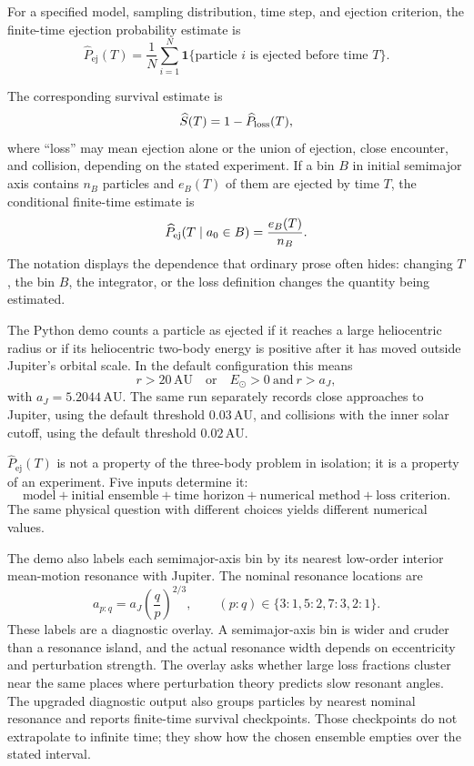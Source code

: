 \begin{definition}
For a specified model, sampling distribution, time step, and ejection criterion,
the finite-time ejection probability estimate is
\[
  \widehat P_{\mathrm{ej}}(T)
  =
  \frac{1}{N}
  \sum_{i=1}^{N}\mathbf 1\{\text{particle \(i\) is ejected before time \(T\)}\}.
\]
\end{definition}

The corresponding survival estimate is
\[
  \widehat S(T)=1-\widehat P_{\rm loss}(T),
\]
where ``loss'' may mean ejection alone or the union of ejection, close
encounter, and collision, depending on the stated experiment.  If a bin
\(B\) in initial semimajor axis contains \(n_B\) particles and \(e_B(T)\) of
them are ejected by time \(T\), the conditional finite-time estimate is
\[
  \widehat P_{\rm ej}(T\mid a_0\in B)=\frac{e_B(T)}{n_B}.
\]
The notation displays the dependence that ordinary prose often hides:
changing \(T\), the bin \(B\), the integrator, or the loss definition changes
the quantity being estimated.

\begin{remark}
The Python demo counts a particle as ejected if it reaches a large heliocentric
radius or if its heliocentric two-body energy is positive after it has moved
outside Jupiter's orbital scale. In the default configuration this means
\[
  r>20\,\mathrm{AU}
  \quad\text{or}\quad
  E_{\odot}>0\ \text{and}\ r>a_J,
\]
with \(a_J=5.2044\,\mathrm{AU}\). The same run separately records close
approaches to Jupiter, using the default threshold \(0.03\,\mathrm{AU}\), and
collisions with the inner solar cutoff, using the default threshold
\(0.02\,\mathrm{AU}\).
\end{remark}

\(\widehat P_{\mathrm{ej}}(T)\) is not a property of the three-body problem in
isolation; it is a property of an experiment. Five inputs determine it:
\[
  \text{model}+\text{initial ensemble}+\text{time horizon}
  +\text{numerical method}+\text{loss criterion}.
\]
The same physical question with different choices yields different numerical
values.

The demo also labels each semimajor-axis bin by its nearest low-order interior
mean-motion resonance with Jupiter. The nominal resonance locations are
\[
  a_{p:q}=a_J\left(\frac{q}{p}\right)^{2/3},
  \qquad
  (p:q)\in\{3:1,5:2,7:3,2:1\}.
\]
These labels are a diagnostic overlay. A semimajor-axis bin is wider and cruder
than a resonance island, and the actual resonance width depends on eccentricity
and perturbation strength. The overlay asks whether large loss fractions cluster
near the same places where perturbation theory predicts slow resonant angles.
The upgraded diagnostic output also groups particles by nearest nominal
resonance and reports finite-time survival checkpoints.  Those checkpoints do
not extrapolate to infinite time; they show how the chosen ensemble empties
over the stated interval.

